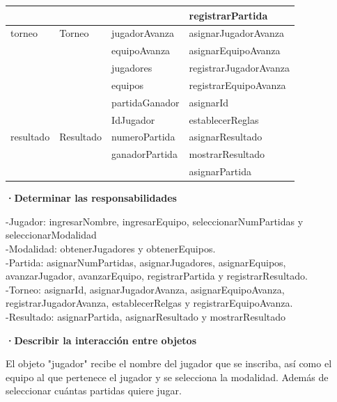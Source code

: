 \documentclass[12pt]{article}
\begin{document}
\begin{table}[H]
\begin{tabular}{|l|l|l|l|}
             &              &                                               & registrarPartida \\ \hline
torneo       & Torneo       & jugadorAvanza                                 & asignarJugadorAvanza \\
             &              & equipoAvanza                                  & asignarEquipoAvanza \\
             &              & jugadores                                     & registrarJugadorAvanza \\
             &              & equipos                                       & registrarEquipoAvanza \\
             &              & partidaGanador                                & asignarId \\ 
             &              & IdJugador                                     & establecerReglas \\ \hline
resultado    & Resultado    & numeroPartida                                 & asignarResultado\\
             &              & ganadorPartida                                & mostrarResultado\\ 
             &              &                                               & asignarPartida \\ \hline
\end{tabular}
\end{table}

\textbf{·Determinar las responsabilidades}

-Jugador: ingresarNombre, ingresarEquipo, seleccionarNumPartidas y seleccionarModalidad \\

-Modalidad: obtenerJugadores y obtenerEquipos. \\

-Partida: asignarNumPartidas, asignarJugadores, asignarEquipos, avanzarJugador, avanzarEquipo, registrarPartida y registrarResultado. \\

-Torneo: asignarId, asignarJugadorAvanza, asignarEquipoAvanza, registrarJugadorAvanza, establecerRelgas y registrarEquipoAvanza. \\

-Resultado: asignarPartida, asignarResultado y mostrarResultado

\textbf{·Describir la interacción entre objetos}

El objeto "jugador" recibe el nombre del jugador que se inscriba, así como el equipo al que pertenece el jugador y se selecciona la modalidad. Además de seleccionar cuántas partidas quiere jugar. \\
\end{document}
